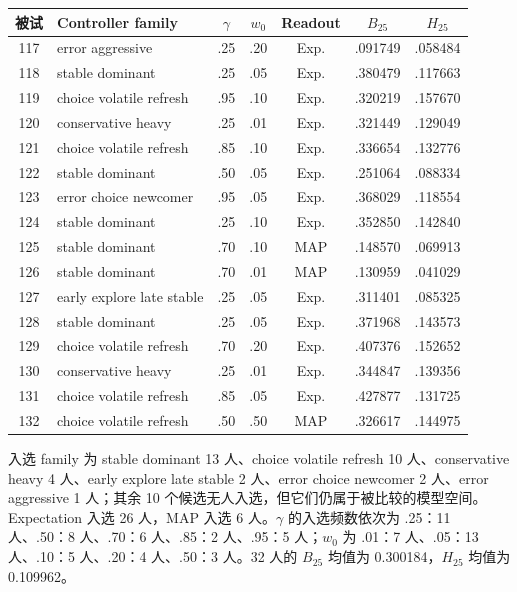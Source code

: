 \begin{center}
\scriptsize
\begin{tabular}{c|l|c|c|c|c|c}
被试 & Controller family & $\gamma$ & $w_0$ & Readout & $B_{25}$ & $H_{25}$\\
\hline
117 & error aggressive & .25 & .20 & Exp. & .091749 & .058484\\
118 & stable dominant & .25 & .05 & Exp. & .380479 & .117663\\
119 & choice volatile refresh & .95 & .10 & Exp. & .320219 & .157670\\
120 & conservative heavy & .25 & .01 & Exp. & .321449 & .129049\\
121 & choice volatile refresh & .85 & .10 & Exp. & .336654 & .132776\\
122 & stable dominant & .50 & .05 & Exp. & .251064 & .088334\\
123 & error choice newcomer & .95 & .05 & Exp. & .368029 & .118554\\
124 & stable dominant & .25 & .10 & Exp. & .352850 & .142840\\
125 & stable dominant & .70 & .10 & MAP & .148570 & .069913\\
126 & stable dominant & .70 & .01 & MAP & .130959 & .041029\\
127 & early explore late stable & .25 & .05 & Exp. & .311401 & .085325\\
128 & stable dominant & .25 & .05 & Exp. & .371968 & .143573\\
129 & choice volatile refresh & .70 & .20 & Exp. & .407376 & .152652\\
130 & conservative heavy & .25 & .01 & Exp. & .344847 & .139356\\
131 & choice volatile refresh & .85 & .05 & Exp. & .427877 & .131725\\
132 & choice volatile refresh & .50 & .50 & MAP & .326617 & .144975\\
\end{tabular}
\end{center}

入选 family 为 stable dominant 13 人、choice volatile refresh 10 人、conservative heavy 4 人、early explore late stable 2 人、error choice newcomer 2 人、error aggressive 1 人；其余 10 个候选无人入选，但它们仍属于被比较的模型空间。Expectation 入选 26 人，MAP 入选 6 人。$\gamma$ 的入选频数依次为 .25：11 人、.50：8 人、.70：6 人、.85：2 人、.95：5 人；$w_0$ 为 .01：7 人、.05：13 人、.10：5 人、.20：4 人、.50：3 人。32 人的 $B_{25}$ 均值为 0.300184，$H_{25}$ 均值为 0.109962。


